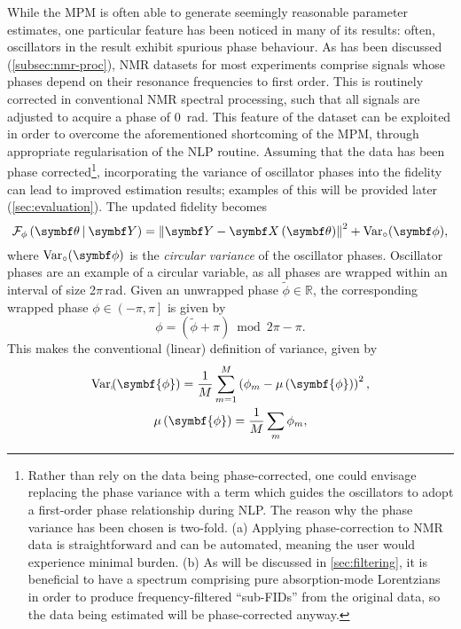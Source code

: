 While the \ac{MPM} is often able to generate seemingly reasonable parameter
estimates,
one particular feature has been noticed in many of its results:
often, oscillators in the result exhibit spurious phase behaviour.
As has been discussed (\cref{subsec:nmr-proc}),
\ac{NMR} datasets for most experiments comprise signals whose phases
depend on their resonance frequencies to first order. This is routinely
corrected in conventional \ac{NMR} spectral processing, such that all signals
are adjusted to acquire a phase of \qty{0}{\radian}. This feature of the
dataset can be exploited in order to overcome the aforementioned shortcoming of
the \ac{MPM}, through appropriate regularisation of the \ac{NLP} routine.
Assuming that the data has been phase corrected\footnote{
    Rather than rely on the data being phase-corrected, one could envisage
    replacing the phase variance with a term which guides the
    oscillators to adopt a first-order phase relationship during \ac{NLP}. The
    reason why the
    phase variance has been chosen is two-fold. (a) Applying phase-correction
    to \ac{NMR} data is straightforward and can be automated,
    meaning the user would experience minimal burden. (b) As will be discussed
    in \cref{sec:filtering}, it is beneficial to have a spectrum comprising
    pure absorption-mode Lorentzians in order to produce frequency-filtered
    ``sub-\acp{FID}'' from the original data, so the data being estimated will
    be phase-corrected anyway.
}, incorporating the variance of oscillator
phases into the fidelity can lead to improved estimation results; examples of
this will be provided later (\cref{sec:evaluation}).
The updated fidelity becomes
\begin{equation}
    \FphithY = \left \lVert \bY - \bXth \right \rVert^2 + \circvar,
    \label{eq:fidelity-phasevar}
\end{equation}
where $\circvar$ is the \emph{circular variance} of the oscillator phases.
Oscillator phases are an example of a circular variable, as all
phases are wrapped within an interval of size 2$\pi$\,\unit{\radian}. Given an
unwrapped phase $\widetilde{\phi} \in \mathbb{R}$, the
corresponding wrapped phase $\phi \in \left( -\pi, \pi \right]$ is given by
\begin{equation}
    \phi = (\widetilde{\phi} + \pi) \bmod 2 \pi - \pi.
    \label{eq:phase_wrap}
\end{equation}
This makes the conventional (linear)
definition of variance, given by
\begin{subequations}
    \begin{gather}
        \Var_{\shortmid}\hspace*{-3pt}\left(\symbf{\phi}\right) =
            \frac{1}{M} \sum_{m=1}^{M} \left(\phi_m - \mu\left(\symbf{\phi}\right)\right)^2, \\
        \mu\left(\symbf{\phi}\right) = \frac{1}{M} \sum_{m} \phi_m,
    \end{gather}
\end{subequations}
